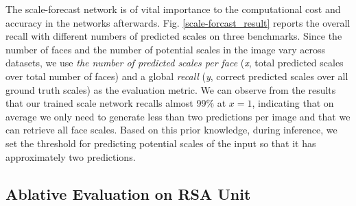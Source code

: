 \documentclass[10pt,twocolumn,letterpaper]{article}
\begin{document}
The scale-forecast network is of vital importance to the computational cost and accuracy in the networks afterwards.
%
Fig. \ref{scale-forcast_result} reports the overall recall with different numbers of predicted scales on three benchmarks.
%
Since the number of faces and the number of potential scales in the image vary across datasets, 
we use  \textit{the number of predicted scales per face} (\textit{x}, total predicted scales over total number of faces) and a global \textit{recall} (\textit{y}, correct predicted scales over all ground truth scales) as the evaluation metric. 
%
We can observe from the results that our trained scale network recalls almost 99\% at $x=1$, 
%
indicating that on average we only need to generate less than two predictions per image and that we can retrieve all face scales.
%
Based on this prior knowledge, during inference, we set the threshold for predicting potential scales of the input so that it has approximately two predictions.


\subsection{Ablative Evaluation on RSA Unit}\label{sec:ablative-evaluation-on-rsa-unit}
\end{document}
